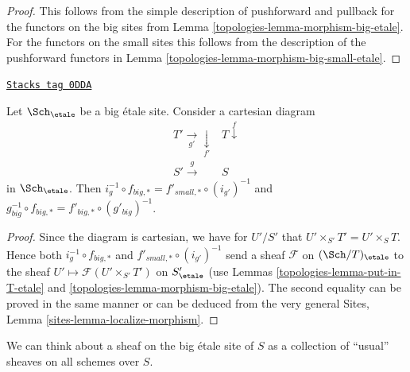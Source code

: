 \begin{proof}

This follows from the simple description of pushforward
and pullback for the functors on the big sites from
Lemma \ref{topologies-lemma-morphism-big-etale}. For the functors
on the small sites this follows from the description of
the pushforward functors in Lemma \ref{topologies-lemma-morphism-big-small-etale}.
\end{proof}

\begin{lemma}
\label{topologies-lemma-morphism-big-small-cartesian-diagram-etale}
\href{https://stacks.math.columbia.edu/tag/0DDA}{\texttt{Stacks tag 0DDA}}

Let $\Sch_\etale$ be a big \'etale site. Consider a cartesian diagram
$$
\begin{array}{cc}T' \underset{g'}{\longrightarrow}\underset{f'}{\downarrow} & T \overset{f}{\downarrow} \\ S' \overset{g}{\longrightarrow} & S\end{array}
$$
in $\Sch_\etale$. Then
$i_g^{-1} \circ f_{big, *} = f'_{small, *} \circ (i_{g'})^{-1}$
and $g_{big}^{-1} \circ f_{big, *} = f'_{big, *} \circ (g'_{big})^{-1}$.
\end{lemma}

\begin{proof}

Since the diagram is cartesian, we have for $U'/S'$
that $U' \times_{S'} T' = U' \times_S T$. Hence both
$i_g^{-1} \circ f_{big, *}$ and $f'_{small, *} \circ (i_{g'})^{-1}$
send a sheaf $\mathcal{F}$ on $(\Sch/T)_\etale$ to the sheaf
$U' \mapsto \mathcal{F}(U' \times_{S'} T')$ on $S'_\etale$
(use Lemmas \ref{topologies-lemma-put-in-T-etale} and \ref{topologies-lemma-morphism-big-etale}).
The second equality can be proved in the same manner or can be
deduced from the very general
Sites, Lemma \ref{sites-lemma-localize-morphism}.
\end{proof}

We can think about a sheaf on the big \'etale site of $S$ as a collection
of ``usual'' sheaves on all schemes over $S$.

